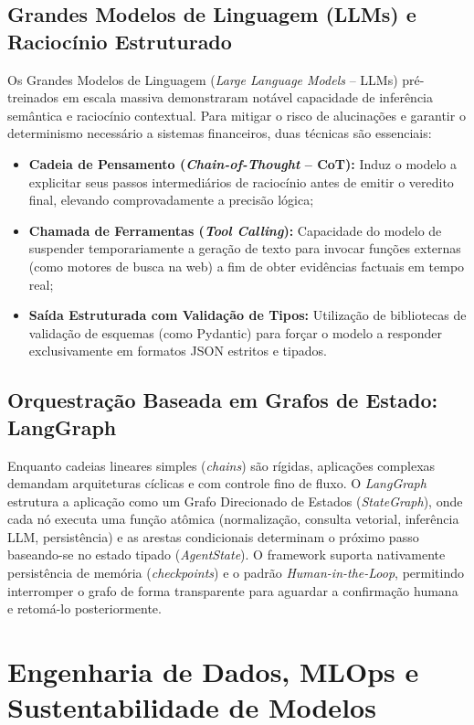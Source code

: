\documentclass[
	12pt,				
	openright,			
	oneside,			
	a4paper,			
	english,			
	brazil				
	]{abntex2}
\begin{document}
\subsection{Grandes Modelos de Linguagem (LLMs) e Raciocínio Estruturado}
Os Grandes Modelos de Linguagem (\textit{Large Language Models} -- LLMs) pré-treinados em escala massiva demonstraram notável capacidade de inferência semântica e raciocínio contextual. Para mitigar o risco de alucinações e garantir o determinismo necessário a sistemas financeiros, duas técnicas são essenciais:
\begin{itemize}
    \item \textbf{Cadeia de Pensamento (\textit{Chain-of-Thought} -- CoT):} Induz o modelo a explicitar seus passos intermediários de raciocínio antes de emitir o veredito final, elevando comprovadamente a precisão lógica;
    \item \textbf{Chamada de Ferramentas (\textit{Tool Calling}):} Capacidade do modelo de suspender temporariamente a geração de texto para invocar funções externas (como motores de busca na web) a fim de obter evidências factuais em tempo real;
    \item \textbf{Saída Estruturada com Validação de Tipos:} Utilização de bibliotecas de validação de esquemas (como Pydantic) para forçar o modelo a responder exclusivamente em formatos JSON estritos e tipados.
\end{itemize}

\subsection{Orquestração Baseada em Grafos de Estado: LangGraph}
Enquanto cadeias lineares simples (\textit{chains}) são rígidas, aplicações complexas demandam arquiteturas cíclicas e com controle fino de fluxo. O \textit{LangGraph} \cite{langchain2024langgraph} estrutura a aplicação como um Grafo Direcionado de Estados (\textit{StateGraph}), onde cada nó executa uma função atômica (normalização, consulta vetorial, inferência LLM, persistência) e as arestas condicionais determinam o próximo passo baseando-se no estado tipado (\textit{AgentState}). O framework suporta nativamente persistência de memória (\textit{checkpoints}) e o padrão \textit{Human-in-the-Loop}, permitindo interromper o grafo de forma transparente para aguardar a confirmação humana e retomá-lo posteriormente.

\section{Engenharia de Dados, MLOps e Sustentabilidade de Modelos}
\label{sec:fund_mlops}
\end{document}
